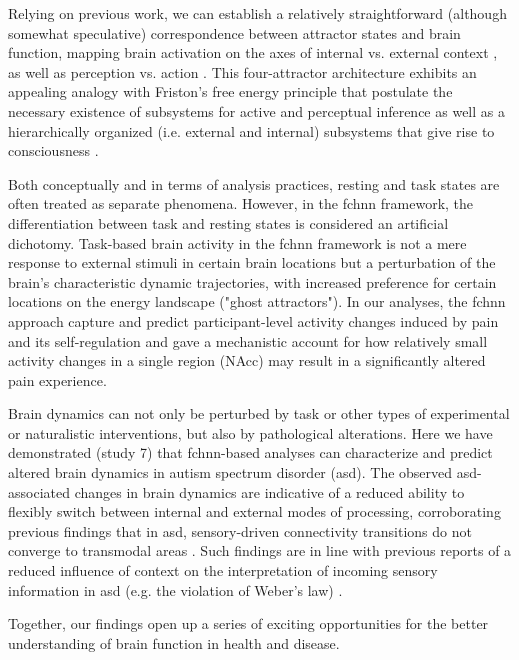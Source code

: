 \documentclass{article}
\begin{document}
Relying on previous work, we can establish a relatively straightforward (although somewhat speculative) correspondence between attractor states and brain function, mapping brain activation on the axes of internal vs. external context \citep{golland2008data, cioli2014differences}, as well as perception vs. action \citep{fuster2004upper}.
This four-attractor architecture exhibits an appealing analogy with Friston's free energy principle \citep{friston2006free} that postulate the necessary existence of subsystems for active and perceptual inference as well as a hierarchically organized (i.e. external and internal) subsystems that give rise to consciousness \citep{ramstead2023inner, lee2023life}.

Both conceptually and in terms of analysis practices, resting and task states are often treated as separate phenomena. However, in the \acrshort{fchnn} framework, the differentiation between task and resting states is considered an artificial dichotomy.
Task-based brain activity in the \acrshort{fchnn} framework is not a mere response to external stimuli in certain brain locations but a perturbation of the brain's characteristic dynamic trajectories, with increased preference for certain locations on the energy landscape ("ghost attractors").
In our analyses, the \acrshort{fchnn} approach capture and predict participant-level activity changes induced by pain and its self-regulation and gave a mechanistic account for how relatively small activity changes in a single region (NAcc) may result in a significantly altered pain experience.

Brain dynamics can not only be perturbed by task or other types of experimental or naturalistic interventions, but also by pathological alterations. Here we have demonstrated (study 7) that \acrshort{fchnn}-based analyses can characterize and predict altered brain dynamics in autism spectrum disorder (\acrshort{asd}). The observed \acrshort{asd}-associated changes in brain dynamics are indicative of a reduced ability to flexibly switch between internal and external modes of processing, corroborating previous findings that in \acrshort{asd}, sensory-driven connectivity transitions do not converge to transmodal areas \citep{hong2019atypical}. Such findings are in line with previous reports of a reduced influence of context on the interpretation of incoming sensory information in \acrshort{asd} (e.g. the violation of Weber's law) \citep{hadad2019perception}.

Together, our findings open up a series of exciting opportunities for the better understanding of brain function in health and disease.
\end{document}
